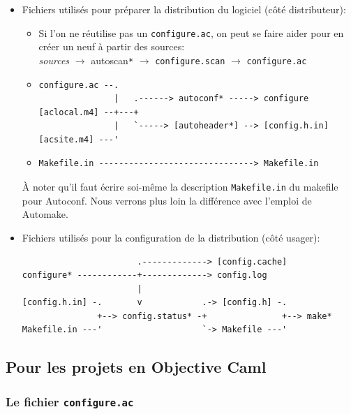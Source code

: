\documentclass[11pt,a4paper]{article}
\newcommand{\bitem}{\item[$\bullet$]}
\begin{document}
\begin{itemize}

  \bitem Fichiers utilisés pour préparer la distribution du
  logiciel (côté distributeur):
  \begin{itemize}

    \bitem Si l'on ne réutilise pas un \texttt{configure.ac}, on peut
    se faire aider pour en créer un neuf à partir des sources:\\
    \emph{sources} $\longrightarrow$
    \textsf{autoscan}\texttt{*} $\longrightarrow$
    \texttt{configure.scan} $\longrightarrow$ \texttt{configure.ac}

    \bitem
{\small
\begin{verbatim}
configure.ac --.
               |   .------> autoconf* -----> configure
[aclocal.m4] --+---+
               |   `-----> [autoheader*] --> [config.h.in]
[acsite.m4] ---'
\end{verbatim}
}

  \bitem
{\small
\begin{verbatim}
Makefile.in -------------------------------> Makefile.in
\end{verbatim}
}

  \end{itemize}

\noindent À noter qu'il faut écrire soi-même la description
\texttt{Makefile.in} du makefile pour \textsf{Autoconf}. Nous verrons
plus loin la différence avec l'emploi de \textsf{Automake}.

  \bitem Fichiers utilisés pour la configuration de la distribution
  (côté usager):
{\small
\begin{verbatim}
                       .-------------> [config.cache]
configure* ------------+-------------> config.log
                       |
[config.h.in] -.       v            .-> [config.h] -.
               +--> config.status* -+               +--> make*
Makefile.in ---'                    `-> Makefile ---'
\end{verbatim}
}
\end{itemize}


\subsection{Pour les projets en \textsf{Objective Caml}}

\subsubsection{Le fichier \texttt{configure.ac}}
\end{document}
